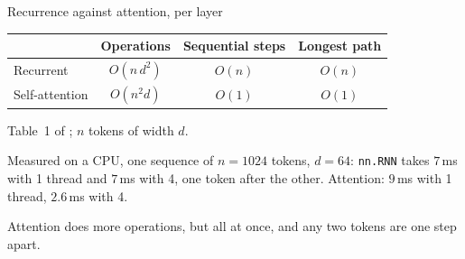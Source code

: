 \documentclass[10pt]{beamer}
\begin{document}
\begin{frame}{Recurrence against attention, per layer}
\small
\centering
\renewcommand{\arraystretch}{1.1}
\begin{tabular}{@{}l c c c@{}}
\toprule
 & \textbf{Operations} & \textbf{Sequential steps} & \textbf{Longest path} \\
\midrule
Recurrent & $O(n\,d^2)$ & $O(n)$ & $O(n)$ \\
Self-attention & $O(n^2d)$ & \alert{$O(1)$} & \alert{$O(1)$} \\
\bottomrule
\end{tabular}

\smallskip
{\footnotesize Table~1 of \citet{vaswani2017}; $n$ tokens of width $d$.\par}

\medskip
\raggedright
Measured on a CPU, one sequence of $n=1024$ tokens, $d=64$: \texttt{nn.RNN} takes $7$\,ms with 1 thread and $7$\,ms with 4, one token after the other. Attention: $9$\,ms with 1 thread, $2.6$\,ms with 4.

\medskip
\alert{Attention does more operations, but all at once, and any two tokens are one step apart.}
\end{frame}
\end{document}
